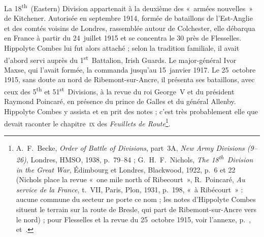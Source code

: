 La 18\textsuperscript{th}~(Eastern) Division appartenait à la deuxième des «~armées nouvelles~» de Kitchener. Autorisée en septembre 1914, formée de bataillons de l'Est-Anglie et des comtés voisins de Londres, rassemblée autour de Colchester, elle débarqua en France à partir du 24~juillet 1915 et se concentra le 30 près de Flesselles.\label{intro:division} Hippolyte Combes lui fut alors attaché ; selon la tradition familiale, il avait d'abord servi auprès du 1\textsuperscript{st}~Battalion, Irish Guards. Le major-général Ivor Maxse, qui l'avait formée, la commanda jusqu'au 15~janvier 1917. Le 25~octobre 1915\label{intro:revue}, sans doute au nord de Ribemont-sur-Ancre, il présenta ses bataillons, avec ceux des 5\textsuperscript{th} et 51\textsuperscript{st}~Divisions, à la revue du roi George~V et du président Raymond Poincaré, en présence du prince de Galles et du général Allenby. Hippolyte Combes y assista et en prit des notes ; c'est très probablement elle que devait raconter le chapitre~\textsc{ix} des \textit{Feuillets de Route}\footnote{A.~F.~Becke, \textit{Order of Battle of Divisions}, part~3A, \textit{New Army Divisions (9--26)}, Londres, HMSO, 1938, p.~79--84 ; G.~H.~F.~Nichols, \textit{The 18\textsuperscript{th}~Division in the Great War}, Édimbourg et Londres, Blackwood, 1922, p.~6 et 22 (Nichols place la revue «~one mile north of Ribecourt~», R.~Poincaré, \textit{Au service de la France}, t.~VII, Paris, Plon, 1931, p.~198, «~à Ribécourt~» : aucune commune du secteur ne porte ce nom ; les notes d'Hippolyte Combes situent le terrain sur la route de Bresle, qui part de Ribemont-sur-Ancre vers le nord) ; pour Flesselles et la revue du 25~octobre 1915, voir l'annexe, p.~\pageref{annexe:doc1-flesselles}, \pageref{annexe:doc6-ix} et~\pageref{annexe:doc7}.}.


